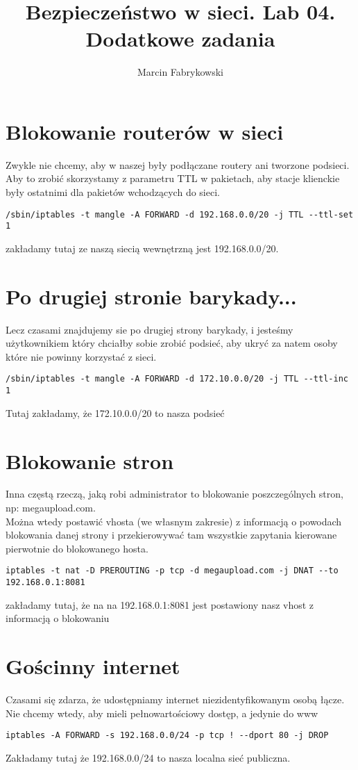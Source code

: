 \documentclass[a4paper,11pt]{article}
\author{Marcin Fabrykowski}
\title{Bezpieczeństwo w sieci. Lab 04. Dodatkowe zadania}
\begin{document}
\maketitle
\newpage
\section{Blokowanie routerów w sieci}
Zwykle nie chcemy, aby w naszej były podłączane routery ani tworzone podsieci. Aby to zrobić skorzystamy z parametru TTL w pakietach, aby stacje klienckie były ostatnimi dla pakietów wchodzących do sieci.
\small
\begin{verbatim}
/sbin/iptables -t mangle -A FORWARD -d 192.168.0.0/20 -j TTL --ttl-set 1
\end{verbatim}
\normalsize
zakładamy tutaj ze naszą siecią wewnętrzną jest 192.168.0.0/20.
\section{Po drugiej stronie barykady...}
Lecz czasami znajdujemy sie po drugiej strony barykady, i jesteśmy użytkownikiem który chciałby sobie zrobić podsieć, aby ukryć za natem osoby które nie powinny korzystać z sieci.
\small
\begin{verbatim}
/sbin/iptables -t mangle -A FORWARD -d 172.10.0.0/20 -j TTL --ttl-inc 1
\end{verbatim}
\normalsize
Tutaj zakładamy, że 172.10.0.0/20 to nasza podsieć
\section{Blokowanie stron}
Inna częstą rzeczą, jaką robi administrator to blokowanie poszczególnych stron, np: megaupload.com.\\
Można wtedy postawić vhosta (we własnym zakresie) z informacją o powodach blokowania danej strony i przekierowywać tam wszystkie zapytania kierowane pierwotnie do blokowanego hosta.
\small
\begin{verbatim}
iptables -t nat -D PREROUTING -p tcp -d megaupload.com -j DNAT --to 192.168.0.1:8081
\end{verbatim}
\normalsize
zakładamy tutaj, że  na na 192.168.0.1:8081 jest postawiony nasz vhost z informacją o blokowaniu
\section{Gościnny internet}
Czasami się zdarza, że udostępniamy internet niezidentyfikowanym osobą łącze. Nie chcemy wtedy, aby mieli pełnowartościowy dostęp, a jedynie do www
\small
\begin{verbatim}
iptables -A FORWARD -s 192.168.0.0/24 -p tcp ! --dport 80 -j DROP
\end{verbatim}
\normalsize
Zakładamy tutaj że 192.168.0.0/24 to nasza localna sieć publiczna.
\end{document}
